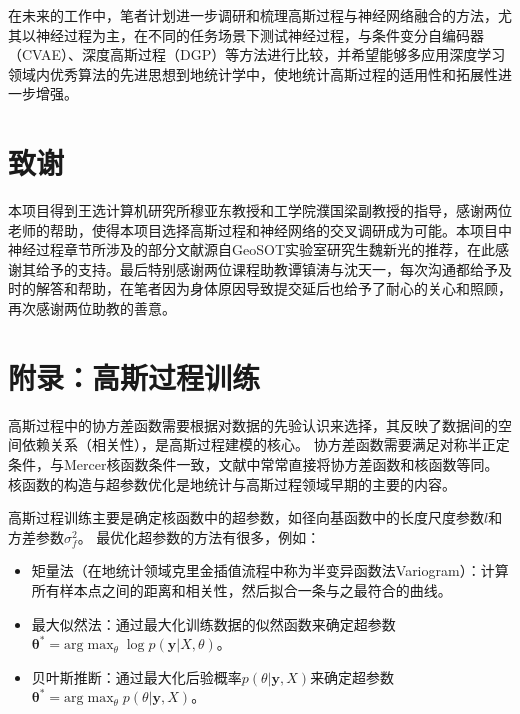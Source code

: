 \documentclass[final]{cvpr}
\begin{document}
在未来的工作中，笔者计划进一步调研和梳理高斯过程与神经网络融合的方法，尤其以神经过程为主，在不同的任务场景下测试神经过程，与条件变分自编码器（CVAE）、深度高斯过程（DGP）等方法进行比较，并希望能够多应用深度学习领域内优秀算法的先进思想到地统计学中，使地统计高斯过程的适用性和拓展性进一步增强。

\section*{致谢} 
本项目得到王选计算机研究所穆亚东教授和工学院濮国梁副教授的指导，感谢两位老师的帮助，使得本项目选择高斯过程和神经网络的交叉调研成为可能。本项目中神经过程章节所涉及的部分文献源自GeoSOT实验室研究生魏新光的推荐，在此感谢其给予的支持。最后特别感谢两位课程助教谭镇涛与沈天一，每次沟通都给予及时的解答和帮助，在笔者因为身体原因导致提交延后也给予了耐心的关心和照顾，再次感谢两位助教的善意。

{\small


}

\appendix
\section{附录：高斯过程训练}\label{sec:appendixA}
\small
高斯过程中的协方差函数需要根据对数据的先验认识来选择，其反映了数据间的空间依赖关系（相关性），是高斯过程建模的核心。
协方差函数需要满足对称半正定条件，与Mercer核函数条件一致\cite{shawe2004kernel}，文献中常常直接将协方差函数和核函数等同。核函数的构造与超参数优化是地统计与高斯过程领域早期的主要的内容\cite{williams2006gaussian,su2020gp,duvenaud2014automatic,cressie1999classes}。

高斯过程训练主要是确定核函数中的超参数，如径向基函数中的长度尺度参数$l$和方差参数$\sigma_f^2$。
最优化超参数的方法有很多，例如：
\begin{itemize}
    \item 矩量法（在地统计领域克里金插值流程中称为半变异函数法Variogram\cite{zimmerman1991comparison}）：计算所有样本点之间的距离和相关性，然后拟合一条与之最符合的曲线。
    \item 最大似然法\cite{williams2006gaussian}：通过最大化训练数据的似然函数来确定超参数$\boldsymbol{\theta^{*}}=\mathrm{arg}\max_{\theta}\log{p(\boldsymbol{y}|X,\theta)}$。
    \item 贝叶斯推断\cite{frigola2013bayesian}：通过最大化后验概率$p(\theta|\boldsymbol{y},X)$来确定超参数$\boldsymbol{\theta^{*}}=\mathrm{arg}\max_{\theta}p(\theta|\boldsymbol{y},X)$。
\end{itemize}
\end{document}
